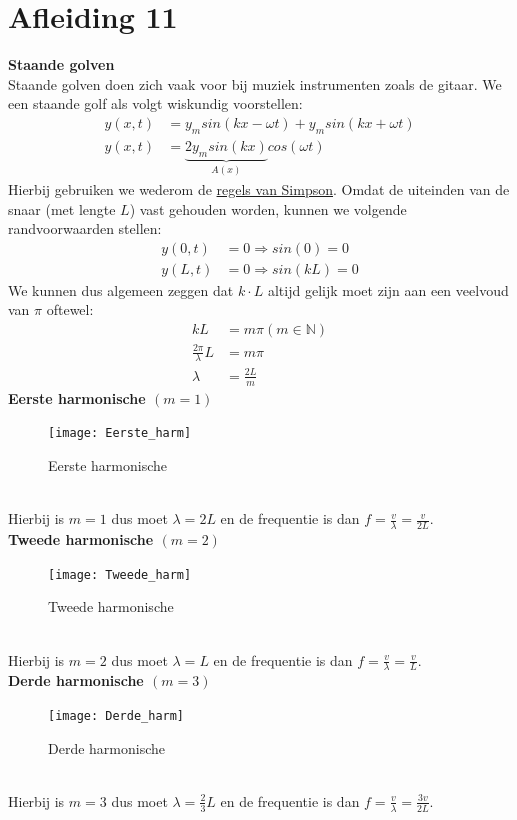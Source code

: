 \documentclass[a4paper,kul]{kulakarticle} %
\begin{document}
\section{Afleiding 11}
\textbf{Staande golven}\\
Staande golven doen zich vaak voor bij muziek instrumenten zoals de gitaar. We een staande golf als volgt wiskundig voorstellen:
\begin{align*}
	y(x,t) &=y_msin(kx-\omega t)+y_msin(kx+\omega t)\\
	y(x,t) &=\underbrace{2y_msin(kx)}_{A(x)}cos(\omega t)
\end{align*}
Hierbij gebruiken we wederom de \href{https://nl.wikipedia.org/wiki/Lijst_van_goniometrische_gelijkheden#Som-naar-product-identiteiten_(regels_van_Simpson)}{regels van Simpson}. Omdat de uiteinden van de snaar (met lengte $L$) vast gehouden worden, kunnen we volgende randvoorwaarden stellen:
\begin{align*}
	y(0,t)  &= 0 \Rightarrow sin(0)=0\\
	y(L,t) &= 0 \Rightarrow sin(kL)=0
\end{align*}
We kunnen dus algemeen zeggen dat $k\cdot L$ altijd gelijk moet zijn aan een veelvoud van $\pi$ oftewel:
\begin{align*}
	kL & = m\pi (m\in\mathbb{N})\\
	\frac{2\pi}{\lambda}L &=m\pi\\
	\lambda & = \frac{2L}{m}
\end{align*}
\textbf{Eerste harmonische $(m = 1)$}\\
\begin{figure}[h]
	\centering
	\texttt{[image: Eerste\_harm]}
	\caption[Eerste harmonische]{Eerste harmonische}
	\label{fig:eersteharm}
\end{figure}\\
Hierbij is $m = 1$ dus moet $\lambda = 2L$ en de frequentie is dan $f = \frac{v}{\lambda} = \frac{v}{2L}$.\\
\newpage
\textbf{Tweede harmonische $(m = 2)$}\\
\begin{figure}[h]
	\centering
	\texttt{[image: Tweede\_harm]}
	\caption[Tweede harmonische]{Tweede harmonische}
	\label{fig:tweedeharm}
\end{figure}\\
Hierbij is $m = 2$ dus moet $\lambda = L$ en de frequentie is dan $f = \frac{v}{\lambda} = \frac{v}{L}$.\\
\textbf{Derde harmonische $(m = 3)$}\\
\begin{figure}[h]
	\centering
	\texttt{[image: Derde\_harm]}
	\caption[Derde harmonische]{Derde harmonische}
	\label{fig:Derdeharm}
\end{figure}\\
Hierbij is $m = 3$ dus moet $\lambda = \frac{2}{3}L$ en de frequentie is dan $f = \frac{v}{\lambda} = \frac{3v}{2L}$.\\
\newpage
\end{document}
